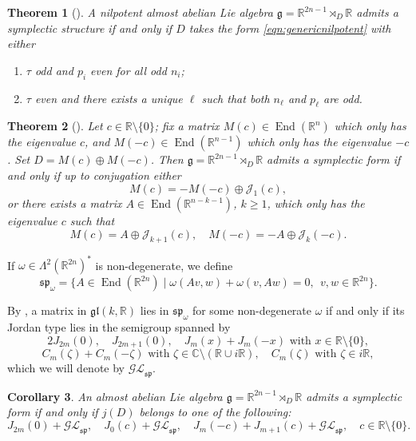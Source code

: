 \documentclass{article}
\newtheorem{theorem}{Theorem}[section]
\newtheorem{corollary}[theorem]{Corollary}
\theoremstyle{definition}
\DeclareMathOperator{\End}{End}
\newcommand{\R}{\mathbb{R}}
\newcommand{\C}{\mathbb{C}}
\newcommand{\frg}{\mathfrak{g}}
\newcommand{\lie}[1]{\mathfrak{#1}}
\newcommand{\gl}{\lie{gl}}
\begin{document}
\begin{theorem}[{\cite[Theorem 5.10]{ArroyoBarberisDiazGodoyHernandez}}]\label{thm:symplecticnilpotent}
    A nilpotent almost abelian Lie algebra $\frg=\R^{2n-1}\rtimes_D\R$ admits a symplectic structure if and only if $D$ takes the form \eqref{eqn:genericnilpotent} with either \begin{enumerate}
        \item $\tau$ odd and $p_i$ even for all odd $n_i$;
        \item $\tau$ even and there exists a unique $\ell$ such that both $n_\ell$ and $p_\ell$ are odd.
    \end{enumerate}
\end{theorem}

\begin{theorem}[{\cite[Theorem 5.24]{ArroyoBarberisDiazGodoyHernandez}}]\label{thm:symplectic_c}
    Let $c\in\R\setminus\{0\}$; fix a matrix $M(c)\in\End(\R^n)$ which only has the eigenvalue $c$, and $M(-c)\in\End(\R^{n-1})$ which only has the eigenvalue $-c$. Set $D=M(c)\oplus M(-c)$. Then $\frg=\R^{2n-1}\rtimes_D\R$ admits a symplectic form if and only if up to conjugation either $$M(c)=-M(-c)\oplus\mathcal{J}_1(c),$$ or there exists a matrix $A\in\End(\R^{n-k-1})$, $k\geq1$, which only has the eigenvalue $c$ such that $$M(c)=A\oplus\mathcal{J}_{k+1}(c),\quad M(-c)=-A\oplus\mathcal{J}_{k}(-c).$$
\end{theorem}

If $\omega\in\Lambda^2(\R^{2n})^*$ is non-degenerate, we define $$\lie{sp}_\omega=\{A\in\End(\R^{2n})\mid \omega(Av,w)+\omega(v,Aw)=0,\ \ v,w\in\R^{2n}\}.$$

By \cite[Theorem 2.4]{Mehl_Rodman_2016}, a matrix in $\gl(k,\R)$ lies in $\lie{sp}_\omega$ for some non-degenerate $\omega$ if and only if its Jordan type lies in the semigroup spanned by $$2J_{2m}(0),\quad J_{2m+1}(0),\quad J_m(x)+J_m(-x)\text{ with }x\in\R\setminus\{0\},$$ $$C_m(\zeta)+C_m(-\zeta)\text{ with }\zeta\in\C\setminus(\R\cup i\R), \quad C_m(\zeta)\text{ with }\zeta\in i\R,$$ which we will denote by $\mathcal{GL}_{\lie{sp}}$.

\begin{corollary}\label{cor:symplectic}
    An almost abelian Lie algebra $\frg=\R^{2n-1}\rtimes_D\R$ admits a symplectic form if and only if $j(D)$ belongs to one of the following: $$J_{2m}(0)+\mathcal{GL}_{\lie{sp}},\quad J_{0}(c)+\mathcal{GL}_{\lie{sp}},\quad J_m(-c)+J_{m+1}(c)+\mathcal{GL}_{\lie{sp}}, \quad c\in\R\setminus\{0\}.$$
\end{corollary}
\end{document}
